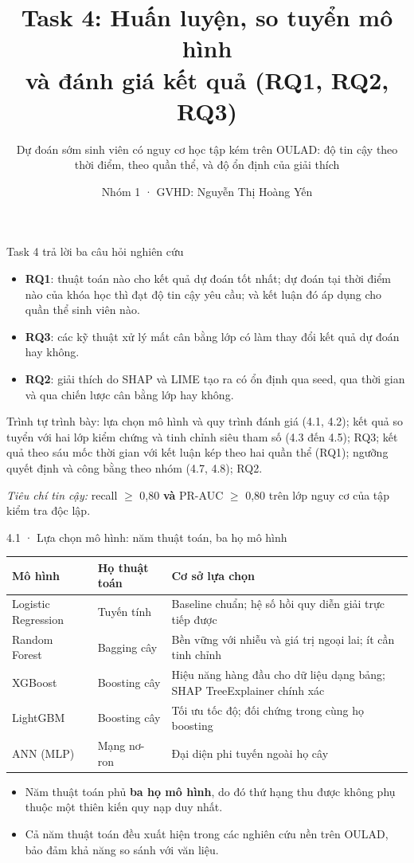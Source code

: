 \documentclass[aspectratio=169,11pt]{beamer}
\title{Task 4: Huấn luyện, so tuyển mô hình\\và đánh giá kết quả (RQ1, RQ2, RQ3)}
\subtitle{Dự đoán sớm sinh viên có nguy cơ học tập kém trên OULAD: độ tin cậy theo thời điểm, theo quần thể, và độ ổn định của giải thích}
\author{Nhóm 1 · GVHD: Nguyễn Thị Hoàng Yến}
\institute{Đại học FPT · DSP391m}
\date{}
\begin{document}
\begin{frame}\titlepage\end{frame}

\begin{frame}{Task 4 trả lời ba câu hỏi nghiên cứu}
\begin{itemize}
  \item \textbf{RQ1}: thuật toán nào cho kết quả dự đoán tốt nhất; dự đoán tại thời điểm nào của khóa học thì đạt độ tin cậy yêu cầu; và kết luận đó áp dụng cho quần thể sinh viên nào.
  \item \textbf{RQ3}: các kỹ thuật xử lý mất cân bằng lớp có làm thay đổi kết quả dự đoán hay không.
  \item \textbf{RQ2}: giải thích do SHAP và LIME tạo ra có ổn định qua seed, qua thời gian và qua chiến lược cân bằng lớp hay không.
\end{itemize}
\vspace{2mm}
Trình tự trình bày: lựa chọn mô hình và quy trình đánh giá (4.1, 4.2); kết quả so tuyển với hai lớp kiểm chứng và tinh chỉnh siêu tham số (4.3 đến 4.5); RQ3; kết quả theo sáu mốc thời gian với kết luận kép theo hai quần thể (RQ1); ngưỡng quyết định và công bằng theo nhóm (4.7, 4.8); RQ2.
\vspace{2mm}

\emph{Tiêu chí tin cậy:} recall $\geq$ 0,80 \textbf{và} PR-AUC $\geq$ 0,80 trên lớp nguy cơ của tập kiểm tra độc lập.
\end{frame}

\begin{frame}{4.1 · Lựa chọn mô hình: năm thuật toán, ba họ mô hình}
\small
\begin{tabular}{@{}lll@{}}
\toprule
\textbf{Mô hình} & \textbf{Họ thuật toán} & \textbf{Cơ sở lựa chọn} \\
\midrule
Logistic Regression & Tuyến tính & Baseline chuẩn; hệ số hồi quy diễn giải trực tiếp được \\
Random Forest & Bagging cây & Bền vững với nhiễu và giá trị ngoại lai; ít cần tinh chỉnh \\
XGBoost & Boosting cây & Hiệu năng hàng đầu cho dữ liệu dạng bảng; SHAP TreeExplainer chính xác \\
LightGBM & Boosting cây & Tối ưu tốc độ; đối chứng trong cùng họ boosting \\
ANN (MLP) & Mạng nơ-ron & Đại diện phi tuyến ngoài họ cây \\
\bottomrule
\end{tabular}
\vspace{4mm}
\begin{itemize}
  \item Năm thuật toán phủ \textbf{ba họ mô hình}, do đó thứ hạng thu được không phụ thuộc một thiên kiến quy nạp duy nhất.
  \item Cả năm thuật toán đều xuất hiện trong các nghiên cứu nền trên OULAD, bảo đảm khả năng so sánh với văn liệu.
\end{itemize}
\end{frame}
\end{document}
